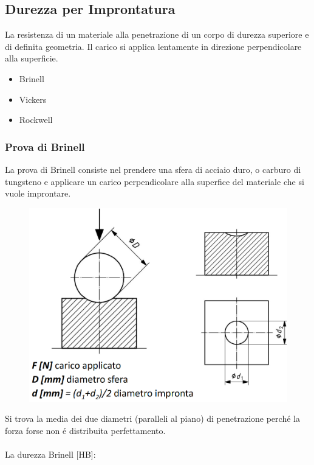 \documentclass{article}
\begin{document}
{        \subsection{Durezza per Improntatura}
                La resistenza di un materiale alla penetrazione di un corpo di durezza superiore e di definita geometria. Il carico si applica lentamente in direzione perpendicolare alla superficie.
                \begin{itemize}
                    \item Brinell
                    \item Vickers
                    \item Rockwell
                \end{itemize}
                \subsubsection{Prova di Brinell}
                    La prova di Brinell consiste nel prendere una sfera di acciaio duro, o carburo di tungsteno e applicare un carico perpendicolare alla superfice del materiale che si vuole improntare.
                    \begin{figure}[!h]
                        \centering
                        \includegraphics[width=.85\linewidth]{Grafico Durezza Brinell.png}
                    \end{figure}
                    Si trova la media dei due diametri (paralleli al piano) di penetrazione perch\'e la forza forse non \'e distribuita perfettamento.\\ \\
                    La durezza Brinell [HB]:
                    \begin{figure}[!h]

\end{figure}}
\end{document}
